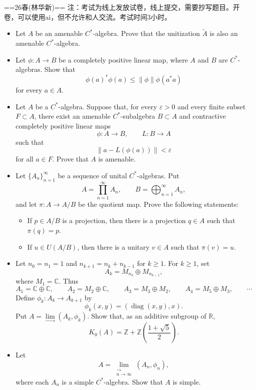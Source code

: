 
==26春(林华新)==
注：考试为线上发放试卷，线上提交，需要抄写题目。开卷，可以使用ai，但不允许和人交流。考试时间3小时。
\begin{itemize}
    \item[Problem 1.] Let $A$ be an amenable $C^*$-algebra. Prove that the unitization $\widetilde{A}$ is also an amenable $C^*$-algebra.

    \item[Problem 2.] Let $\phi:A\to B$ be a completely positive linear map, where $A$ and $B$ are $C^*$-algebras. Show that
    $$\phi(a)^*\phi(a)\leq \|\phi\|\phi(a^*a)$$
    for every $a\in A$.

    \item[Problem 3.] Let $A$ be a $C^*$-algebra. Suppose that, for every $\varepsilon>0$ and every finite subset $F\subset A$, there exist an amenable $C^*$-subalgebra $B\subset A$ and contractive completely positive linear maps
    $$\phi:A\to B,\qquad L:B\to A$$
    such that
    $$\|a-L(\phi(a))\|<\varepsilon$$
    for all $a\in F$. Prove that $A$ is amenable.

    \item[Problem 4.] Let $\{A_n\}_{n=1}^{\infty}$ be a sequence of unital $C^*$-algebras. Put
    $$A=\prod_{n=1}^{\infty}A_n,\qquad B=\bigoplus_{n=1}^{\infty}A_n,$$
    and let $\pi:A\to A/B$ be the quotient map. Prove the following statements:
    \begin{itemize}
        \item[(a)] If $p\in A/B$ is a projection, then there is a projection $q\in A$ such that $\pi(q)=p$.
        \item[(b)] If $u\in U(A/B)$, then there is a unitary $v\in A$ such that $\pi(v)=u$.
    \end{itemize}

    \item[Problem 5.] Let $n_0=n_1=1$ and $n_{k+1}=n_k+n_{k-1}$ for $k\geq 1$. For $k\geq 1$, set
    $$A_k=M_{n_k}\oplus M_{n_{k-1}},$$
    where $M_1=\mathbb{C}$. Thus
    $$A_1=\mathbb{C}\oplus\mathbb{C},\qquad A_2=M_2\oplus\mathbb{C},\qquad A_3=M_3\oplus M_2,\qquad A_4=M_5\oplus M_3,\qquad \cdots$$
    Define $\phi_k:A_k\to A_{k+1}$ by
    $$\phi_k(x,y)=(\operatorname{diag}(x,y),x).$$
    Put $A=\lim\limits_{\longrightarrow}(A_k,\phi_k)$. Show that, as an additive subgroup of $\mathbb{R}$,
    $$K_0(A)=\mathbb{Z}+\mathbb{Z}\left(\frac{1+\sqrt{5}}{2}\right).$$

    \item[Problem 6.] Let
    $$A=\lim\limits_{\substack{\longrightarrow\\ n\to\infty}}(A_n,\phi_n),$$
    where each $A_n$ is a simple $C^*$-algebra. Show that $A$ is simple.
\end{itemize}